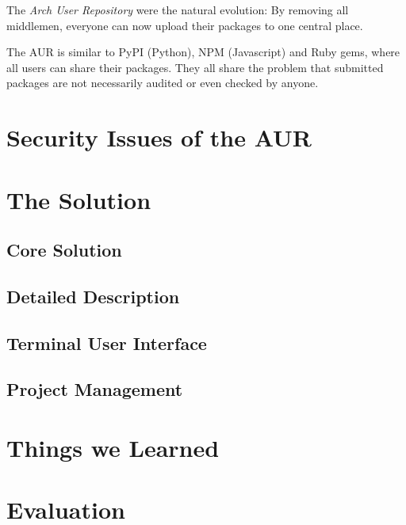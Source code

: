 \documentclass{scrartcl}
\begin{document}
  The \emph{Arch User Repository} were the natural evolution: By removing all middlemen, everyone can now upload their packages to one central place. \cite{wiki:AUR}

  The AUR is similar to PyPI (Python), NPM (Javascript) and Ruby gems, where all users can share their packages. They all share the problem that submitted packages are not necessarily audited or even checked by anyone.

  \section{Security Issues of the AUR} %

  \section{The Solution} %
    \subsection{Core Solution}  %
    \subsection{Detailed Description} %
    
    \subsection{Terminal User Interface} %
    
    \subsection{Project Management} %

  \section{Things we Learned} %
  

  \section{Evaluation} %

  \pagebreak
  
  
\end{document}
